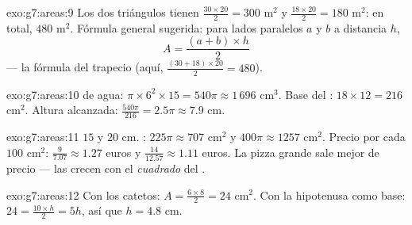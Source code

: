\begin{solution}{exo:g7:areas:9}
Los dos triángulos tienen  $\frac{30 \times 20}{2} = 300$ m$^2$
y $\frac{18 \times 20}{2} = 180$ m$^2$: en total, $480$ m$^2$. Fórmula
general sugerida: para lados paralelos $a$ y $b$ a distancia $h$,
\[
A = \frac{(a + b) \times h}{2}
\]
--- la fórmula del trapecio (aquí, $\frac{(30+18)\times 20}{2} = 480$).
\end{solution}

\begin{solution}{exo:g7:areas:10}
 de agua: $\pi \times 6^2 \times 15 = 540\pi \approx 1\,696$
cm$^3$. Base del : $18 \times 12 = 216$ cm$^2$. Altura alcanzada:
$\frac{540\pi}{216} = 2.5\pi \approx 7.9$ cm.
\end{solution}

\begin{solution}{exo:g7:areas:11}
 $15$ y $20$ cm. : $225\pi \approx 707$ cm$^2$ y
$400\pi \approx 1257$ cm$^2$. Precio por cada $100$ cm$^2$:
$\frac{9}{7.07} \approx 1.27$ euros y
$\frac{14}{12.57} \approx 1.11$ euros. La pizza grande sale mejor de
precio --- las  crecen con el \emph{cuadrado} del .
\end{solution}

\begin{solution}{exo:g7:areas:12}
Con los catetos: $A = \frac{6 \times 8}{2} = 24$ cm$^2$. Con la
hipotenusa como base: $24 = \frac{10 \times h}{2} = 5h$, así que
$h = 4.8$ cm.
\end{solution}

